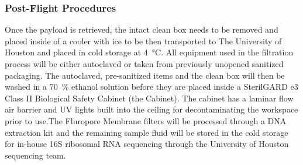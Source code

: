 \subsubsection{Post-Flight Procedures}

Once the payload is retrieved, the intact clean box needs to be removed and placed inside of a cooler with ice to be then transported to The University of Houston and placed in cold storage at \SI{4}{\celsius}. All equipment used in the filtration process will be either autoclaved or taken from previously unopened sanitized packaging. The autoclaved, pre-sanitized items and the clean box will then be washed in a \SI{70}{\percent} ethanol solution before they are placed inside a SterilGARD e3 Class II Biological Safety Cabinet (the Cabinet). The cabinet has a laminar flow air barrier and UV lights built into the ceiling for decontaminating the workspace prior to use.The Fluropore Membrane filters will be processed through a DNA extraction kit and the remaining sample fluid will be stored in the cold storage for in-house 16S ribosomal RNA sequencing through the University of Houston sequencing team.  

